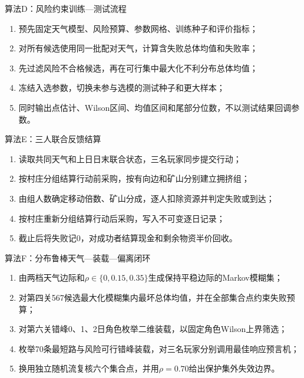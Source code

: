 \begin{resultbox}{算法D：风险约束训练—测试流程}
\begin{enumerate}[leftmargin=1.8em]
  \item 预先固定天气模型、风险预算、参数网格、训练种子和评价指标；
  \item 对所有候选使用同一批配对天气，计算含失败总体均值和失败率；
  \item 先过滤风险不合格候选，再在可行集中最大化不利分布总体均值；
  \item 冻结入选参数，切换未参与选模的测试种子和更大样本；
  \item 同时输出点估计、Wilson区间、均值区间和尾部分位数，不以测试结果回调参数。
\end{enumerate}
\end{resultbox}

\begin{resultbox}{算法E：三人联合反馈结算}
\begin{enumerate}[leftmargin=1.8em]
  \item 读取共同天气和上日日末联合状态，三名玩家同步提交行动；
  \item 按村庄分组结算行动前采购，按有向边和矿山分别建立拥挤组；
  \item 由组人数确定移动倍数、矿山分成，逐人扣除资源并判定失败或到达；
  \item 按村庄重新分组结算行动后采购，写入不可变逐日记录；
  \item 截止后将失败记0，对成功者结算现金和剩余物资半价回收。
\end{enumerate}
\end{resultbox}

\begin{resultbox}{算法F：分布鲁棒天气—装载—偏离闭环}
\begin{enumerate}[leftmargin=1.8em]
  \item 由两档天气边际和$\rho\in\{0,0.15,0.35\}$生成保持平稳边际的Markov模糊集；
  \item 对第四关567候选最大化模糊集内最坏总体均值，并在全部集合点约束失败预算；
  \item 对第六关错峰0、1、2日角色枚举二维装载，以固定角色Wilson上界筛选；
  \item 枚举70条最短路与风险可行错峰装载，对三名玩家分别调用最佳响应预言机；
  \item 换用独立随机流复核六个集合点，并用$\rho=0.70$给出保护集外失效边界。
\end{enumerate}
\end{resultbox}


